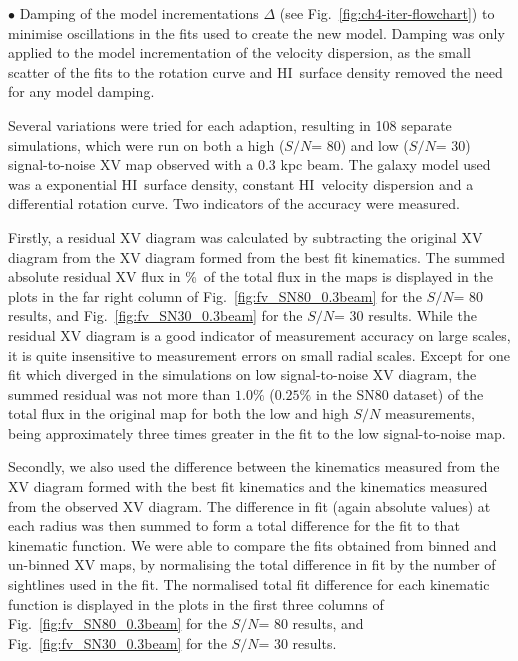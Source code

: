 \documentclass[traditabstract]{aa} %
\newcommand\HI{H{\small I}}
\begin{document}
$\bullet $ Damping of the model incrementations $\Delta$ (see
  Fig.~\ref{fig:ch4-iter-flowchart}) to minimise oscillations in the 
fits used to create the new model. Damping was only applied to the
  model incrementation of the velocity dispersion, as the small
  scatter of the fits to the rotation curve and \HI\ surface density
  removed the need for any model damping.

Several variations were tried for each adaption, resulting in 108
separate simulations, which were run on both a high ($S/N$= 80) and low
($S/N$= 30) signal-to-noise XV map observed with a $0.3$ kpc beam. The
galaxy model used was a exponential \HI\ surface density, constant \HI\
velocity dispersion and a differential rotation curve. 
Two indicators of the accuracy were measured.


Firstly, a residual XV diagram was calculated by subtracting the original XV
 diagram from the XV diagram 
formed from the best fit kinematics. The summed absolute residual
XV flux in \%\ of the total flux in the maps
is displayed in the plots in the far right column of
Fig.~\ref{fig:fv_SN80_0.3beam} for the $S/N$= 80 results, and
Fig.~\ref{fig:fv_SN30_0.3beam} for the $S/N$= 30 results. While the
residual XV diagram is a good indicator of measurement accuracy on large
scales, it is quite insensitive to measurement errors on small
radial scales.
Except for one fit which diverged in the simulations on low
signal-to-noise XV diagram, the summed residual was not more than $1.0\%$
($0.25\%$ in the SN80 dataset) of the total flux in the original map
for both the low and high $S/N$ measurements, being approximately three
times greater in the fit to the low signal-to-noise map.

Secondly, we also used the difference between the kinematics measured 
from the XV diagram formed with the best fit kinematics and the
kinematics measured from the observed XV diagram. The difference in fit 
(again absolute values) at each radius was then summed to form
a total difference for the fit to that kinematic function. We were able 
to compare the fits obtained from binned and un-binned XV maps, by 
normalising the total
difference in fit by the number of sightlines used in the fit. 
The normalised total fit difference for each kinematic function is 
displayed in the
plots in the first three columns of Fig.~\ref{fig:fv_SN80_0.3beam} for the
$S/N$= 80 results, and Fig.~\ref{fig:fv_SN30_0.3beam} for the $S/N$= 30
results.
\end{document}
